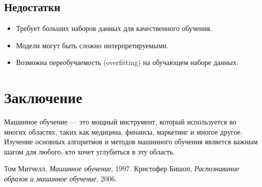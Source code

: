\documentclass[a4paper,12pt]{article}
\begin{document}
\subsection{Недостатки}
\begin{itemize}
    \item Требует больших наборов данных для качественного обучения.
    \item Модели могут быть сложно интерпретируемыми.
    \item Возможна переобучаемость (overfitting) на обучающем наборе данных.
\end{itemize}

\section{Заключение}
Машинное обучение — это мощный инструмент, который используется во многих областях, таких как медицина, финансы, маркетинг и многое другое. Изучение основных алгоритмов и методов машинного обучения является важным шагом для любого, кто хочет углубиться в эту область.

\begin{thebibliography}{9}
     Том Митчелл, \textit{Машинное обучение}, 1997.
     Кристофер Бишоп, \textit{Распознавание образов и машинное обучение}, 2006.
\end{thebibliography}
\end{document}
